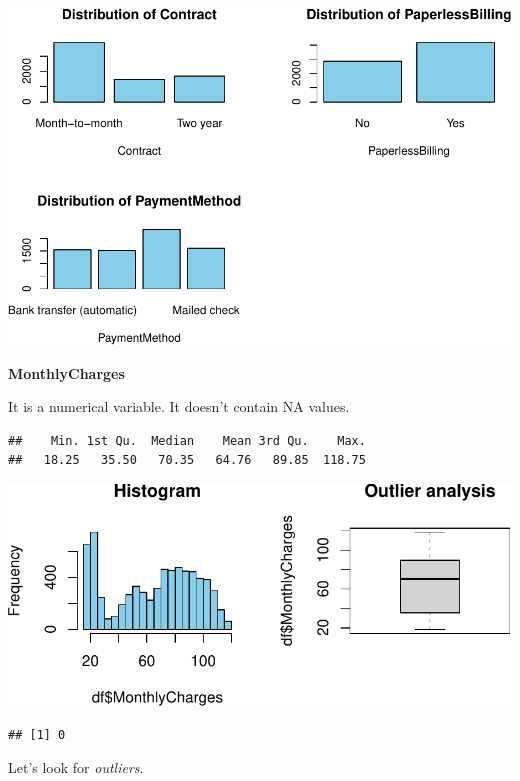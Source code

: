 \documentclass[
  twoside]{article}
\begin{document}
\includegraphics{Assigment2_files/figure-latex/unnamed-chunk-32-1.pdf}

\textbf{MonthlyCharges}

It is a numerical variable. It doesn't contain NA values.

\begin{verbatim}
##    Min. 1st Qu.  Median    Mean 3rd Qu.    Max. 
##   18.25   35.50   70.35   64.76   89.85  118.75
\end{verbatim}

\includegraphics{Assigment2_files/figure-latex/unnamed-chunk-33-1.pdf}

\begin{verbatim}
## [1] 0
\end{verbatim}

Let's look for \emph{outliers}.
\end{document}
